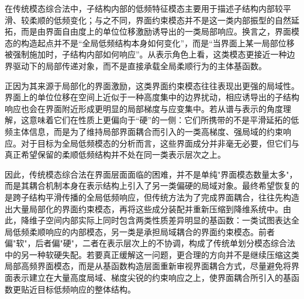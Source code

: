 在传统模态综合法中，子结构内部的低频特征模态主要用于描述子结构内部较平滑、较柔顺的低频变化；与之不同，界面约束模态并不是这一类内部振型的自然延拓，而是由界面自由度上的单位位移激励诱导出的一类局部响应。换言之，界面模态的构造起点并不是“全局低频结构本身如何变化”，而是“当界面上某一局部位移被强制施加时，子结构内部如何响应”。从表示角色上看，这类模态更接近一种边界驱动下的局部传递对象，而不是直接承载全局柔顺行为的主体基函数。

正因为其来源于局部化的界面激励，这类界面约束模态往往表现出更强的局域性。界面上的单位位移在空间上近似于一种高度集中的边界扰动，相应诱导出的子结构响应也会在界面附近形成更明显的局部梯度与应变集中。若从谱与表示的角度理解，这意味着它们在性质上更偏向于“硬”的一侧：它们所携带的不是平滑延拓的低频主体信息，而是为了维持局部界面耦合而引入的一类高梯度、强局域的约束响应。对于目标为全局低频模态的分析而言，这些界面成分并非毫无必要，但它们与真正希望保留的柔顺低频结构并不处在同一类表示层次之上。

因此，传统模态综合法在界面层面面临的困难，并不是单纯"界面模态数量太多"，而是其耦合机制本身在表示结构上引入了另一类偏硬的局域对象。最终希望恢复的是跨子结构平滑传播的全局低频响应，但传统方法为了完成界面耦合，往往先构造出大量局部化的界面约束模态，再将这些成分装配并重新压缩到降维系统中。由此，降维子空间内部实际上同时包含两类性质差异明显的基函数：一类试图表达全局低频柔顺响应的内部模态，另一类是承担局域耦合的界面约束模态。前者偏"软"，后者偏"硬"，二者在表示层次上的不协调，构成了传统单划分模态综合法中的另一种软硬失配。若要真正缓解这一问题，更合理的方向并不是继续压缩这类局部高频界面模态，而是从基函数构造层面重新审视界面耦合方式，尽量避免将界面表示建立在大量高度局域、梯度尖锐的约束响应之上，使界面耦合所引入的基函数更贴近目标低频响应的整体结构。
